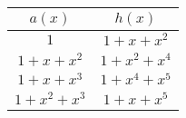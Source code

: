 \begin{table*}[h!]
 \caption{$f(x)=1+x+x^2$}
\centering
 \begin{tabular}{c c} 
 \hline
 $a(x)$ & $h(x)$\\ [0.5ex] 
 \hline\hline
$1$ & $1+x+x^2$\\ 
\hline
$1+x+x^2$ &  $1+x^2+x^4$\\
\hline
$1+x+x^3$ & $1+x^4+x^5$\\
\hline
$1+x^2+x^3$ & $1+x+x^5$ 
 \end{tabular}
 \label{novelTab8}
\end{table*}





